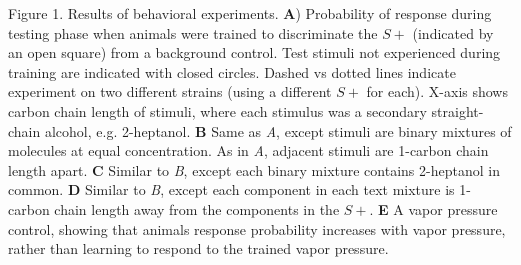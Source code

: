 Figure 1. Results of behavioral experiments. \textbf{A}) Probability of response during testing phase when animals were trained to discriminate the $S+$ (indicated by an open square) from a background control.  Test stimuli not experienced during training are indicated with closed circles.  Dashed vs dotted lines indicate experiment on two different strains (using a different $S+$ for each).  X-axis shows carbon chain length of stimuli, where each stimulus was a secondary straight-chain alcohol, e.g. 2-heptanol.  \textbf{B} Same as \textit{A}, except stimuli are binary mixtures of molecules at equal concentration.  As in \textit{A}, adjacent stimuli are 1-carbon chain length apart. \textbf{C} Similar to \textit{B}, except each binary mixture contains 2-heptanol in common. \textbf{D} Similar to \textit{B}, except each component in each text mixture is 1-carbon chain length away from the components in the $S+$. \textbf{E} A vapor pressure control, showing that animals response probability increases with vapor pressure, rather than learning to respond to the trained vapor pressure.  